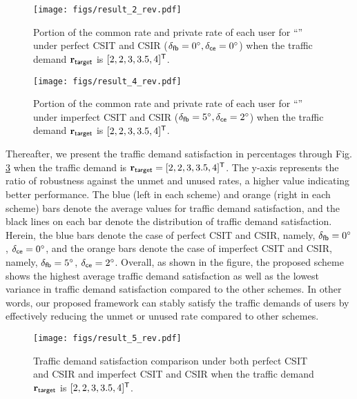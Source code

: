 \documentclass[draftclsnofoot, onecolumn, comsoc, 12pt]{IEEEtran}
\begin{document}
\begin{figure}[!t]
\centering
 		\texttt{[image: figs/result\_2\_rev.pdf]}
 		\caption{{Portion of the common rate and private rate of each user for ``{}'' under perfect CSIT and CSIR ($\delta_{\sf{fb}}=0^{\circ}, \delta_{\sf{ce}}=0^{\circ}$) when the traffic demand $\mathbf{r}_{\sf{target}}$ is $[2, 2, 3, 3.5, 4]^{\sf{T}}$.}}
    	\label{result_2} %
\end{figure}

\begin{figure}[!t]
\centering
 		\texttt{[image: figs/result\_4\_rev.pdf]}
 		\caption{{Portion of the common rate and private rate of each user for ``{}''  under imperfect CSIT and CSIR ($\delta_{\sf{fb}}=5^{\circ}, \delta_{\sf{ce}}=2^{\circ}$) when the traffic demand $\mathbf{r}_{\sf{target}}$ is $[2, 2, 3, 3.5, 4]^{\sf{T}}$.}}
    	\label{result_4} %
\end{figure}




{Thereafter, we present the traffic demand satisfaction in percentages through Fig. \ref{result_5} when the traffic demand is $\mathbf{r}_{\sf{target}} = [2, 2, 3, 3.5, 4]^{\sf{T}}$.}
The y-axis represents the ratio of robustness against the {unmet} and {unused rates}, a higher value indicating better performance. The blue (left in each scheme) and orange (right in each scheme) bars denote the average values for traffic demand satisfaction, and the black lines on each bar denote the distribution of traffic demand satisfaction. Herein, the blue bars denote the case of perfect CSIT and CSIR, namely, $\delta_{\sf{fb}} = 0^{\circ}$, $\delta_{\sf{ce}} = 0^{\circ}$, and the orange bars denote the case of imperfect CSIT and CSIR, namely, $\delta_{\sf{fb}} = 5^{\circ}$, $\delta_{\sf{ce}} = 2^{\circ}$. 
Overall, as shown in the figure, the proposed scheme shows the highest average traffic demand satisfaction as well as the lowest variance in traffic demand satisfaction compared to the other schemes. 
In other words, our proposed framework can stably satisfy the traffic demands of users by effectively reducing the {unmet} or {unused rate} compared to other schemes.


\begin{figure}[!t]
\centering
 		\texttt{[image: figs/result\_5\_rev.pdf]}%
 		\caption{{Traffic demand satisfaction comparison under both perfect CSIT and CSIR and imperfect CSIT and CSIR when the traffic demand $\mathbf{r}_{\sf{target}}$ is $[2, 2, 3, 3.5, 4]^{\sf{T}}$.}}
    	\label{result_5} %
\end{figure}
\end{document}
